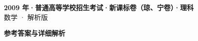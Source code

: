 \documentclass[zihao=-4, a4paper]{ctexart}
\begin{document}
\begin{center}
  {\Large\bfseries 2009 年·普通高等学校招生考试·新课标卷（琼、宁卷）·理科}\\[4pt]
  {\large 数学 · 解析版}
\end{center}
\medskip
{}

\clearpage
{}
\begin{center}{\Large\bfseries 参考答案与详细解析}\end{center}
\medskip

\end{document}
